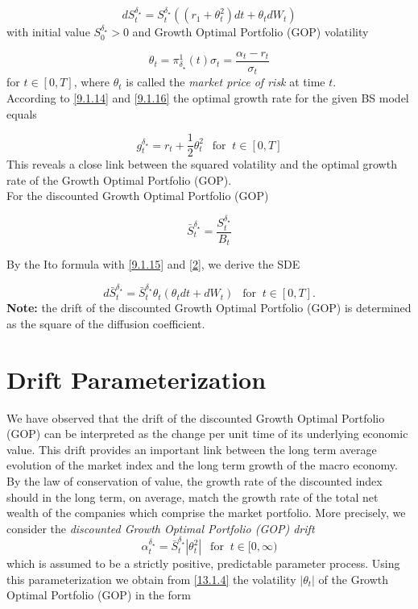 \documentclass[a4 paper, 12pt]{report}
\theoremstyle{plain}
\begin{document}
\begin{equation}\label{9.1.15}
dS_t^{\delta_\star} = S_t^{\delta_\star}((r_1+\theta_t^2)dt+\theta_tdW_t)
\end{equation}
with initial value $S_0^{\delta_\star}>0$ and Growth Optimal Portfolio (GOP) volatility

\begin{equation}\label{9.1.16}
\theta_t = \pi_{\delta_\star}^1(t)\sigma_t = \frac{\alpha_t - r_t}{\sigma_t}
\end{equation}
for $t \in [0, T]$, where $\theta_t$ is called the \emph{market price of risk} at time $t$.\\
According to \eqref{9.1.14} and \eqref{9.1.16} the optimal growth rate for the given BS model equals

\begin{equation}\label{9.1.17}
g_t^{\delta_\star} = r_t+\frac{1}{2}\theta^2_t ~~\mbox{  for  }~t\in[0,T]
\end{equation}
This reveals a close link between the squared volatility and the optimal growth rate of the Growth Optimal Portfolio (GOP).\\
For the discounted Growth Optimal Portfolio (GOP)

\begin{equation}\label{9.1.18}
\bar{S}_t^{\delta_\star} = \frac{S_t^{\delta_\star}}{B_t}
\end{equation}

By the Ito formula with \eqref{9.1.15} and \eqref{2}, we derive the SDE

\begin{equation}\label{9.1.19}
d\bar{S}_t^{\delta_\star} = \bar{S}_t^{\delta_\star}\theta_t(\theta_tdt+dW_t)~~\mbox{  for  }~t\in[0,T].
\end{equation}
\textbf{Note:} the drift of the discounted Growth Optimal Portfolio (GOP) is determined as the square of the diffusion coefficient.

\section{Drift Parameterization}
\noindent
\par We have observed that the drift of the discounted Growth Optimal Portfolio (GOP) can be interpreted as the change per unit time of its
underlying economic value. This drift provides an important link between the long term average evolution of the
market index and the long term growth of the macro economy. By the law of conservation of value, the growth rate
of the discounted index should in the long term, on average, match the growth rate of the total net wealth of the
companies which comprise the market portfolio. More precisely, we consider the \emph{discounted Growth Optimal Portfolio (GOP) drift}
\begin{equation}\label{13.1.4}
\alpha_t^{\delta_\star} = \bar{S}_{t}^{\delta_\star}|\theta_t^2|~~\mbox{  for  }~t\in[0,\infty)
\end{equation}
which is assumed to be a strictly positive, predictable parameter process. Using this parameterization we obtain from \eqref{13.1.4} the volatility $|\theta_t|$ of the Growth Optimal Portfolio (GOP) in the form
\end{document}
